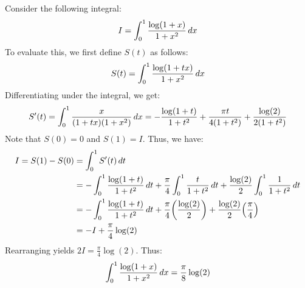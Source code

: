 \documentclass[main.tex]{subfiles}
\begin{document}
\begin{example}\label{serret_integral}
    Consider the following integral:
    \begin{equation*}
        I = \int_0^1 \frac{\log(1+x)}{1+x^2}\,dx
    \end{equation*}
    To evaluate this, we first define $S(t)$ as follows:
    \begin{equation*}
        S(t) = \int_0^1 \frac{\log(1+tx)}{1+x^2}\,dx
    \end{equation*}
    Differentiating under the integral, we get:
    \begin{equation*}
        S'(t)
        = \int_0^1 \frac{x}{(1+tx)(1+x^2)}\,dx
        = -\frac{\log(1+t)}{1+t^2} + \frac{\pi t}{4(1+t^2)} + \frac{\log(2)}{2(1+t^2)}
    \end{equation*}
    Note that $S(0)=0$ and $S(1)=I$. Thus, we have:
    \begin{align*}
        I
        = S(1) - S(0)
        &= \int_0^1 S'(t)\,dt \\
        &= -\int_0^1 \frac{\log(1+t)}{1+t^2}\,dt + \frac{\pi}{4}\int_0^1 \frac{t}{1+t^2}\,dt + \frac{\log(2)}{2}\int_0^1 \frac{1}{1+t^2}\,dt \\
        &= -\int_0^1 \frac{\log(1+t)}{1+t^2}\,dt + \frac{\pi}{4}\qty(\frac{\log(2)}{2}) + \frac{\log(2)}{2}\qty(\frac{\pi}{4}) \\
        &= -I + \frac{\pi}{4}\log(2)
    \end{align*}
    Rearranging yields $2I=\frac{\pi}{4}\log(2)$. Thus:
    \begin{equation*}
        \int_0^1 \frac{\log(1+x)}{1+x^2}\,dx = \frac{\pi}{8}\log(2)
    \end{equation*}
\end{example}
\end{document}
